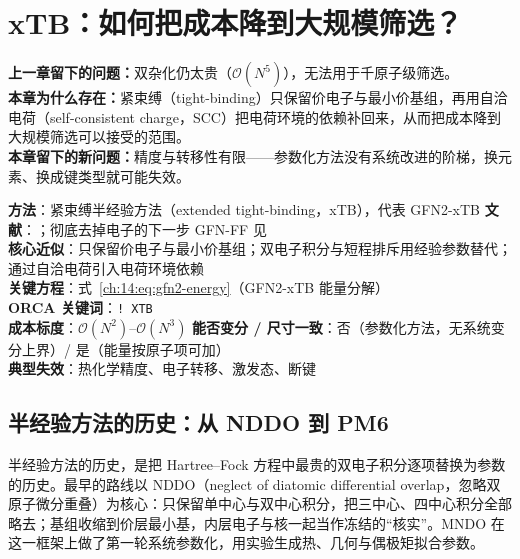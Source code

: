 
\section{xTB：如何把成本降到大规模筛选？}
\label{ch:14:sec:title}

\begin{problemchain}
\textbf{上一章留下的问题：}双杂化仍太贵（$\mathcal{O}(N^5)$），无法用于千原子级筛选。\\
\textbf{本章为什么存在：}紧束缚（tight-binding）只保留价电子与最小价基组，再用自洽电荷（self-consistent charge，SCC）把电荷环境的依赖补回来，从而把成本降到大规模筛选可以接受的范围。\\
\textbf{本章留下的新问题：}精度与转移性有限——参数化方法没有系统改进的阶梯，换元素、换成键类型就可能失效。
\end{problemchain}

\begin{methodcard}
\textbf{方法}：紧束缚半经验方法（extended tight-binding，xTB），代表 GFN2-xTB\quad
\textbf{文献}：\citep{bannwarth2019gfn2}；彻底去掉电子的下一步 GFN-FF 见 \citep{spicher2020gfnff}\\
\textbf{核心近似}：只保留价电子与最小价基组；双电子积分与短程排斥用经验参数替代；通过自洽电荷引入电荷环境依赖\\
\textbf{关键方程}：式~\eqref{ch:14:eq:gfn2-energy}（GFN2-xTB 能量分解）\\
\textbf{ORCA 关键词}：\texttt{! XTB}\\
\textbf{成本标度}：$\mathcal{O}(N^2)$–$\mathcal{O}(N^3)$\quad
\textbf{能否变分 / 尺寸一致}：否（参数化方法，无系统变分上界）/ 是（能量按原子项可加）\\
\textbf{典型失效}：热化学精度、电子转移、激发态、断键
\end{methodcard}

\subsection{半经验方法的历史：从 NDDO 到 PM6}
\label{ch:14:sec:history}

半经验方法的历史，是把 Hartree--Fock 方程中最贵的双电子积分逐项替换为参数的历史。最早的路线以 NDDO（neglect of diatomic differential overlap，忽略双原子微分重叠）为核心：只保留单中心与双中心积分，把三中心、四中心积分全部略去；基组收缩到价层最小基，内层电子与核一起当作冻结的“核实”。MNDO 在这一框架上做了第一轮系统参数化，用实验生成热、几何与偶极矩拟合参数\citep{dewar1977mndo}。

